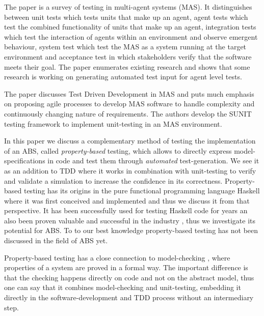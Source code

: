 The paper \cite{nguyen_testing_2011} is a survey of testing in multi-agent systems (MAS). It distinguishes between unit tests which tests units that make up an agent, agent tests which test the combined functionality of units that make up an agent, integration tests which test the interaction of agents within an environment and observe emergent behaviour, system test which test the MAS as a system running at the target environment and acceptance test in which stakeholders verify that the software meets their goal. The paper enumerates existing research and shows that some research is working on generating automated test input for agent level tests.

The paper \cite{tiryaki_sunit:_2007} discusses Test Driven Development in MAS and puts much emphasis on proposing agile processes to develop MAS software to handle complexity and continuously changing nature of requirements. The authors develop the SUNIT testing framework to implement unit-testing in an MAS environment.

In this paper we discuss a complementary method of testing the implementation of an ABS, called \textit{property-based} testing, which allows to directly express model-specifications in code and test them through \textit{automated} test-generation. We see it as an addition to TDD where it works in combination with unit-testing to verify and validate a simulation to increase the confidence in its correctness. Property-based testing has its origins \cite{claessen_quickcheck:_2000, claessen_testing_2002, runciman_smallcheck_2008} in the pure functional programming language Haskell \cite{hudak_history_2007} where it was first conceived and implemented and thus we discuss it from that perspective. It has been successfully used for testing Haskell code for years an also been proven valuable and successful in the industry \cite{hughes_quickcheck_2007}, thus we investigate its potential for ABS. To to our best knowledge property-based testing has not been discussed in the field of ABS yet. 

Property-based testing has a close connection to model-checking \cite{mcmillan_symbolic_1993}, where properties of a system are proved in a formal way. The important difference is that the checking happens directly on code and not on the abstract model, thus one can say that it combines model-checking and unit-testing, embedding it directly in the software-development and TDD process without an intermediary step.

